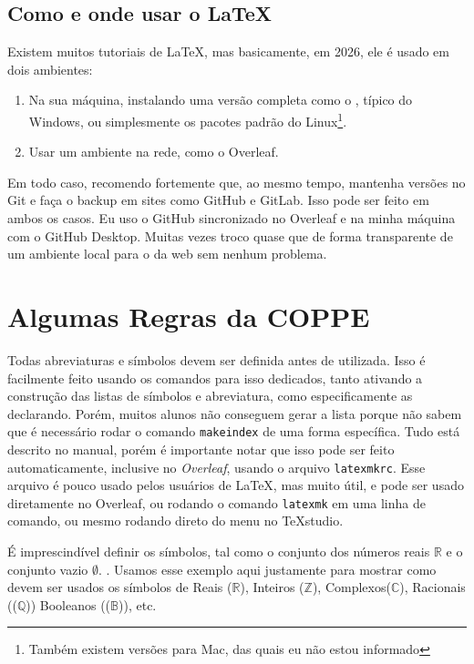 \documentclass[dsc,setavermelha]{ufrj}
\theoremstyle{plain}
\theoremstyle{definition}
\theoremstyle{remark}
\begin{document}
\section{Como e onde usar o \LaTeX}

  Existem muitos tutoriais de \LaTeX, mas basicamente, em 2026, ele é usado em dois ambientes:
  \begin{enumerate}
  \item Na sua máquina, instalando uma versão completa como o , típico do Windows, ou simplesmente os pacotes padrão do Linux\footnote{Também existem versões para Mac, das quais eu não estou informado}.
  \item Usar um ambiente na rede, como o Overleaf.
  \end{enumerate}

  Em todo caso, recomendo fortemente que, ao mesmo tempo, mantenha versões no Git e faça o backup em sites como GitHub e GitLab. Isso pode ser feito em ambos os casos. Eu uso o GitHub sincronizado no Overleaf e na minha máquina com o GitHub Desktop. Muitas vezes troco quase que de forma transparente de um ambiente local para o da web sem nenhum problema.

\chapter{Algumas Regras da COPPE}

  Todas abreviaturas e símbolos devem ser definida antes de utilizada. Isso é facilmente feito usando os comandos para isso dedicados, tanto ativando a construção das listas de símbolos e abreviatura, como especificamente as declarando. Porém, muitos alunos não conseguem gerar a lista porque não sabem que é necessário rodar o comando \verb*|makeindex| de uma forma específica. Tudo está descrito no manual, porém é importante notar que isso pode ser feito automaticamente, inclusive no \textit{Overleaf}, usando o arquivo \verb*|latexmkrc|. Esse arquivo é pouco usado pelos usuários de \LaTeX, mas muito útil, e pode ser usado diretamente no Overleaf, ou rodando o comando \verb|latexmk| em uma linha de comando, ou mesmo rodando direto do menu no TeXstudio.

  É imprescindível definir os símbolos, tal como o
  conjunto dos números reais $\mathbb{R}$ e o conjunto vazio $\emptyset$.
  . Usamos esse exemplo aqui justamente para mostrar como devem ser usados os símbolos de Reais ($\mathbb{R}$), Inteiros ($\mathbb{Z}$), Complexos($\mathbb{C}$), Racionais (($\mathbb{Q}$)) Booleanos (($\mathbb{B}$)), etc.
\end{document}
